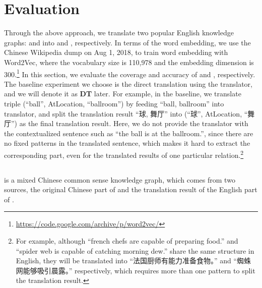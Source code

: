 \section{Evaluation}
\label{sec:evaluation}
Through the above approach, we translate two popular English knowledge graphs: \con and \pro into \zhcon and \zhpro, respectively. In terms of the word embedding, we use the Chinese Wikipedia dump on Aug 1, 2018,  to train word embedding with Word2Vec, where the vocabulary size is 110,978 and the embedding dimension is 300.\footnote{\url{https://code.google.com/archive/p/word2vec/}}
In this section, we evaluate the coverage and accuracy of \zhcon and \zhpro, respectively. The baseline experiment we choose is the direct translation using the translator, and we will denote it as \textbf{DT} later. For example, in the baseline, we translate triple (``ball'', AtLocation, ``ballroom'') by feeding ``ball, ballroom'' into translator, and split the translation result ``球, 舞厅'' into (``球'', AtLocation, ``舞厅'') as the final translation result. Here, we do not provide the translator with the contextualized sentence such as ``the ball is at the ballroom.'', since there are no fixed patterns in the translated sentence, which makes it hard to extract the corresponding part, even for the translated results of one particular relation.\footnote{For example, although ``french chefs are capable of preparing food.'' and ``spider web is capable of catching morning dew.'' share the same structure in English, they will be translated into ``法国厨师有能力准备食物。'' and ``蜘蛛网能够吸引晨露。'' respectively, which requires more than one pattern to split the translation result.}


\subsection{\zhcon}
\zhcon is a mixed Chinese common sense knowledge graph, which comes from two sources, 
the original Chinese part of \con and the translation result of the English part of \con.

